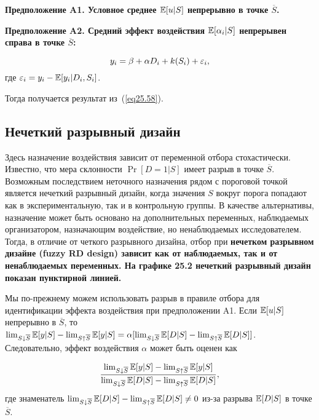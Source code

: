 \bfseries Предположение A1. \mdseries Условное среднее $\mathbb{E} [u|S]$ непрерывно в точке $\overline{S}$. 

\bfseries Предположение A2. \mdseries Средний эффект воздействия $\mathbb{E} [\alpha_i|S]$ непрерывен справа в точке $\overline{S}$:

\begin{equation}
\label{eq25.59}
y_i = \beta + \alpha D_i + k(S_i) + \varepsilon_i ,
\end{equation}
где $\varepsilon_i = y_i - \mathbb{E} [y_i | D_i , S_i ]$. 

Тогда получается результат из~(\ref{eq25.58}). 

\subsection{Нечеткий разрывный дизайн}

Здесь назначение воздействия зависит от переменной отбора стохастически. Известно, что мера склонности $\Pr[D = 1|S]$ имеет разрыв в точке $\overline{S}$. Возможным последствием неточного назначения рядом с пороговой точкой является нечеткий разрывный дизайн, когда значения $S$ вокруг порога попадают как в экспериментальную, так и в контрольную группы. В качестве альтернативы, назначение может быть основано на дополнительных переменных, наблюдаемых организатором, назначающим воздействие, но ненаблюдаемых исследователем. Тогда, в отличие от четкого разрывного дизайна, отбор при \bfseries нечетком разрывном дизайне (fuzzy RD design) \mdseries зависит как от наблюдаемых, так и от ненаблюдаемых переменных. На графике 25.2 нечеткий разрывный дизайн показан пунктирной линией. 

Мы по-прежнему можем использовать разрыв в правиле отбора для идентификации эффекта воздействия при предположении A1. Если $\mathbb{E} [u|S]$ непрерывно в $\overline{S}$, то $\lim_{S \downarrow \overline{S}} \mathbb{E}[y|S] - \lim_{S \uparrow \overline{S}} \mathbb{E}[y|S] = \alpha [\lim_{S \downarrow \overline{S}} \mathbb{E}[D|S] - \lim_{S \uparrow \overline{S}} \mathbb{E}[D|S] ]$. Следовательно, эффект воздействия $\alpha$ может быть оценен как

\begin{equation}
\label{eq25.60}
\frac{\lim_{S \downarrow \overline{S}} \mathbb{E}[y|S] - \lim_{S \uparrow \overline{S}} \mathbb{E}[y|S]}{\lim_{S \downarrow \overline{S}} \mathbb{E}[D|S] - \lim_{S \uparrow \overline{S}} \mathbb{E}[D|S]},
\end{equation}
где знаменатель $\lim_{S \downarrow \overline{S}} \mathbb{E}[D|S] - \lim_{S \uparrow \overline{S}} \mathbb{E}[D|S] \ne 0$ из-за разрыва $\mathbb{E}[D|S]$ в точке $\overline{S}$. 

